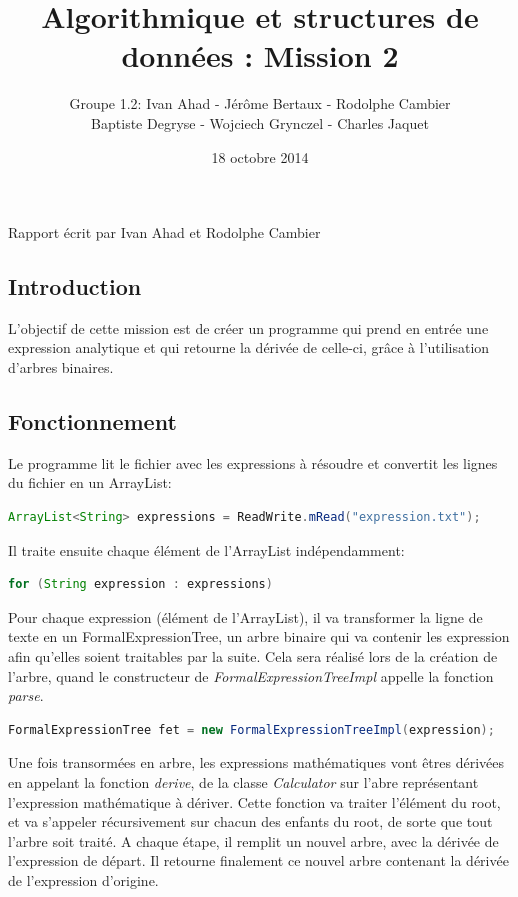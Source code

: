 \documentclass[a4paper]{article}
\title{Algorithmique et structures de données : Mission 2}
\date{18 octobre 2014}
\author{Groupe 1.2: Ivan Ahad - Jérôme Bertaux - Rodolphe Cambier \\ 
	Baptiste Degryse - Wojciech Grynczel - Charles Jaquet}
\begin{document}
\maketitle



Rapport écrit par Ivan Ahad et Rodolphe Cambier

\subsection*{Introduction}

L'objectif de cette mission est de créer un programme qui prend en entrée une expression analytique et qui retourne la dérivée de celle-ci, grâce à l'utilisation d'arbres binaires. 

\subsection*{Fonctionnement}

Le programme lit le fichier avec les expressions à résoudre et convertit les lignes du fichier en un ArrayList: 
\begin{lstlisting}[language=Java]
ArrayList<String> expressions = ReadWrite.mRead("expression.txt");
\end{lstlisting}

Il traite ensuite chaque élément de l'ArrayList indépendamment:
\begin{lstlisting}[language=Java]
for (String expression : expressions)
\end{lstlisting}

Pour chaque expression (élément de l'ArrayList), il va transformer la ligne de texte en un FormalExpressionTree, un arbre binaire qui va contenir les expression afin qu'elles soient traitables par la suite. Cela sera réalisé lors de la création de l'arbre, quand le constructeur de\textit{ FormalExpressionTreeImpl} appelle la fonction \textit{parse}.
\begin{lstlisting}[language=Java]
FormalExpressionTree fet = new FormalExpressionTreeImpl(expression);
\end{lstlisting}
						
Une fois transormées en arbre, les expressions mathématiques vont êtres dérivées en appelant la fonction \textit{derive}, de la classe \textit{Calculator} sur l'abre représentant l'expression mathématique à dériver. Cette fonction va traiter l'élément du root, et va s'appeler récursivement sur chacun des enfants du root, de sorte que tout l'arbre soit traité. A chaque étape, il remplit un nouvel arbre, avec la dérivée de l'expression de départ. Il retourne finalement ce nouvel arbre contenant la dérivée de l'expression d'origine.
\end{document}
